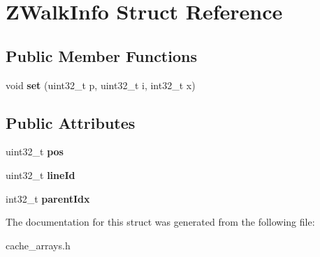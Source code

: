 \hypertarget{structZWalkInfo}{\section{Z\-Walk\-Info Struct Reference}
\label{structZWalkInfo}
}
\subsection*{Public Member Functions}
\begin{DoxyCompactItemize}
\item 
\hypertarget{structZWalkInfo_a44eda449e523dc1b3a48a413918b2d3b}{void {\bfseries set} (uint32\-\_\-t p, uint32\-\_\-t i, int32\-\_\-t x)}\label{structZWalkInfo_a44eda449e523dc1b3a48a413918b2d3b}

\end{DoxyCompactItemize}
\subsection*{Public Attributes}
\begin{DoxyCompactItemize}
\item 
\hypertarget{structZWalkInfo_acbfb8147f815605e0e3580fa92a3a187}{uint32\-\_\-t {\bfseries pos}}\label{structZWalkInfo_acbfb8147f815605e0e3580fa92a3a187}

\item 
\hypertarget{structZWalkInfo_af0dfc727049902878bfcedab409c7a98}{uint32\-\_\-t {\bfseries line\-Id}}\label{structZWalkInfo_af0dfc727049902878bfcedab409c7a98}

\item 
\hypertarget{structZWalkInfo_a2514b51301f4964200344fdd55a747d0}{int32\-\_\-t {\bfseries parent\-Idx}}\label{structZWalkInfo_a2514b51301f4964200344fdd55a747d0}

\end{DoxyCompactItemize}


The documentation for this struct was generated from the following file\-:\begin{DoxyCompactItemize}
\item 
cache\-\_\-arrays.\-h\end{DoxyCompactItemize}
